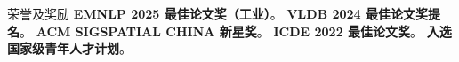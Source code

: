 \begin{rubric}{荣誉及奖励}
\entry*[2025]%
	\textbf{EMNLP 2025 最佳论文奖（工业）}。
\entry*[2024]%
	\textbf{VLDB 2024 最佳论文奖提名}。
\entry*[2023]%
	\textbf{ACM SIGSPATIAL CHINA 新星奖}。
\entry*[2022]%
	\textbf{ICDE 2022 最佳论文奖}。
\entry*[2022]%
	\textbf{入选国家级青年人才计划}。
\end{rubric}
